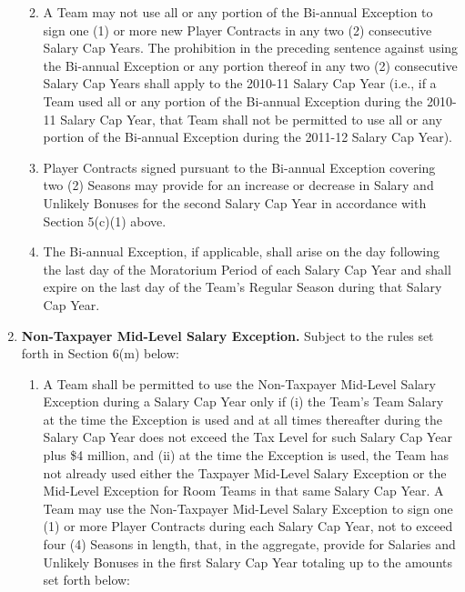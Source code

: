 \documentclass[
]{book}
\providecommand{\tightlist}{%
  \setlength{\itemsep}{0pt}\setlength{\parskip}{0pt}}
\begin{document}
\begin{enumerate}
  \begin{enumerate}
  \def\labelenumii{(\arabic{enumii})}
  \setcounter{enumii}{1}
  \tightlist
  \item
    A Team may not use all or any portion of the Bi-annual Exception to sign one (1) or more new Player Contracts in any two (2) consecutive Salary Cap Years. The prohibition in the preceding sentence against using the Bi-annual Exception or any portion thereof in any two (2) consecutive Salary Cap Years shall apply to the 2010-11 Salary Cap Year (i.e., if a Team used all or any portion of the Bi-annual Exception during the 2010-11 Salary Cap Year, that Team shall not be permitted to use all or any portion of the Bi-annual Exception during the 2011-12 Salary Cap Year).
  \item
    Player Contracts signed pursuant to the Bi-annual Exception covering two (2) Seasons may provide for an increase or decrease in Salary and Unlikely Bonuses for the second Salary Cap Year in accordance with Section 5(c)(1) above.
  \item
    The Bi-annual Exception, if applicable, shall arise on the day following the last day of the Moratorium Period of each Salary Cap Year and shall expire on the last day of the Team's Regular Season during that Salary Cap Year.
  \end{enumerate}
\item
  \textbf{Non-Taxpayer Mid-Level Salary Exception.} Subject to the rules set forth in Section 6(m) below:

  \begin{enumerate}
  \def\labelenumii{(\arabic{enumii})}
  \tightlist
  \item
    A Team shall be permitted to use the Non-Taxpayer Mid-Level Salary Exception during a Salary Cap Year only if (i) the Team's Team Salary at the time the Exception is used and at all times thereafter during the Salary Cap Year does not exceed the Tax Level for such Salary Cap Year plus \$4 million, and (ii) at the time the Exception is used, the Team has not already used either the Taxpayer Mid-Level Salary Exception or the Mid-Level Exception for Room Teams in that same Salary Cap Year. A Team may use the Non-Taxpayer Mid-Level Salary Exception to sign one (1) or more Player Contracts during each Salary Cap Year, not to exceed four (4) Seasons in length, that, in the aggregate, provide for Salaries and Unlikely Bonuses in the first Salary Cap Year totaling up to the amounts set forth below:
  \end{enumerate}


\end{enumerate}
\end{document}
